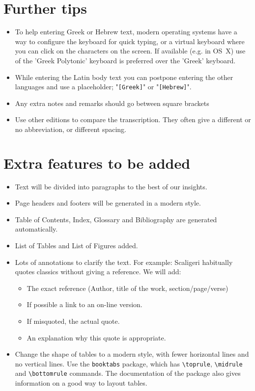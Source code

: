 \documentclass{report}
\begin{document}
\section{Further tips}
\begin{itemize}
\item To help entering Greek or Hebrew text, modern operating systems
have a way to configure the keyboard for quick typing, or a virtual
keyboard where you can click on the characters on the screen.
If available (e.g. in OS~X) use of the 'Greek Polytonic' keyboard is
preferred over the 'Greek' keyboard.

\item While entering the Latin body text you can postpone entering the other
languages and use a placeholder;
 "\verb+[Greek]+" or
 "\verb+[Hebrew]+".

\item Any extra notes and remarks should go between square brackets

\item Use other editions to compare the transcription. They often give a
 different or no abbreviation, or different spacing.

\end{itemize}


\section{Extra features to be added}
\begin{itemize}
\item Text will be divided into paragraphs to the best of our insights.
\item Page headers and footers will be generated in a modern style.
\item Table of Contents, Index, Glossary and Bibliography are generated
automatically.
\item List of Tables and List of Figures added.
\item Lots of annotations to clarify the text.
For example: Scaligeri habitually quotes classics without giving a reference.
We will add:
    \begin{itemize}
    \item The exact reference (Author, title of the work, section/page/verse)
    \item If possible a link to an on-line version.
    \item If misquoted, the actual quote.
    \item An explanation why this quote is appropriate.
    \end{itemize}
\item Change the shape of tables to a modern style,
with fewer horizontal lines and no
vertical lines. Use the \verb+booktabs+ package, which has
\verb+\toprule+,
\verb+\midrule+ and
\verb+\bottomrule+ commands.
The documentation of the package also gives information on a good way
to layout tables.
\end{itemize}
\end{document}
